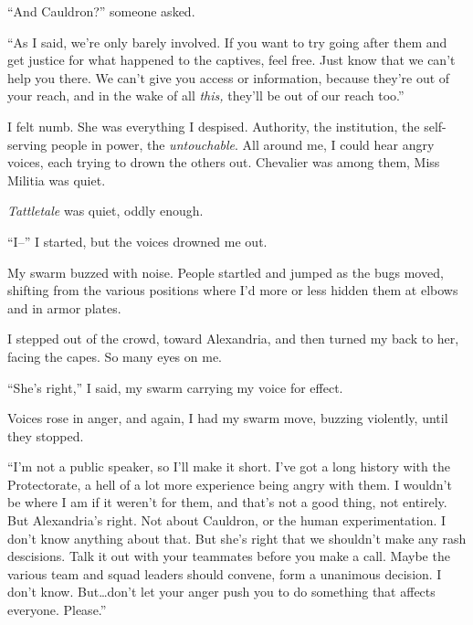 ``And Cauldron?'' someone asked.



``As I said, we're only barely involved.  If you want to try going after them and get justice for what happened to the captives, feel free.  Just know that we can't help you there.  We can't give you access or information, because they're out of your reach, and in the wake of all \emph{this, }they'll be out of our reach too.''



I felt numb.  She was everything I despised.  Authority, the institution, the self-serving people in power, the \emph{untouchable}.  All around me, I could hear angry voices, each trying to drown the others out.  Chevalier was among them, Miss Militia was quiet.



\emph{Tattletale} was quiet, oddly enough.



``I--'' I started, but the voices drowned me out.



My swarm buzzed with noise.  People startled and jumped as the bugs moved, shifting from the various positions where I'd more or less hidden them at elbows and in armor plates.



I stepped out of the crowd, toward Alexandria, and then turned my back to her, facing the capes.  So many eyes on me.



``She's right,'' I said, my swarm carrying my voice for effect.



Voices rose in anger, and again, I had my swarm move, buzzing violently, until they stopped.



``I'm not a public speaker, so I'll make it short.  I've got a long history with the Protectorate, a hell of a lot more experience being angry with them.  I wouldn't be where I am if it weren't for them, and that's not a good thing, not entirely.  But Alexandria's right.  Not about Cauldron, or the human experimentation.  I don't know anything about that.  But she's right that we shouldn't make any rash descisions.  Talk it out with your teammates before you make a call.  Maybe the various team and squad leaders should convene, form a unanimous decision.  I don't know.  But\ldots don't let your anger push you to do something that affects everyone.  Please.''



